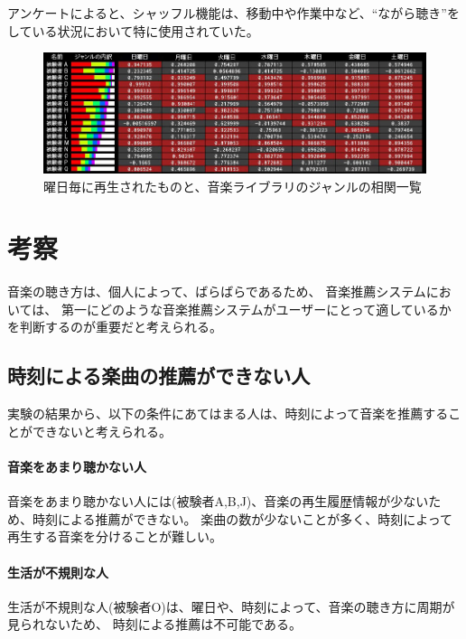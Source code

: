 \documentclass[11pt, onecolumn]{jsarticle}
\begin{document}
アンケートによると、シャッフル機能は、移動中や作業中など、``ながら聴き''をしている状況において特に使用されていた。



\begin{figure}
\begin{center}
\includegraphics[width = 14cm]{corTable.jpg}
\caption{曜日毎に再生されたものと、音楽ライブラリのジャンルの相関一覧}
\label{corTable}
\end{center}
\end{figure}


\section{考察}
音楽の聴き方は、個人によって、ばらばらであるため、
音楽推薦システムにおいては、
第一にどのような音楽推薦システムがユーザーにとって適しているかを判断するのが重要だと考えられる。

\subsection{時刻による楽曲の推薦ができない人}
実験の結果から、以下の条件にあてはまる人は、時刻によって音楽を推薦することができないと考えられる。
\paragraph{音楽をあまり聴かない人}
音楽をあまり聴かない人には(被験者A,B,J)、音楽の再生履歴情報が少ないため、時刻による推薦ができない。
楽曲の数が少ないことが多く、時刻によって再生する音楽を分けることが難しい。

\paragraph{生活が不規則な人}
生活が不規則な人(被験者O)は、曜日や、時刻によって、音楽の聴き方に周期が見られないため、
時刻による推薦は不可能である。
\end{document}
